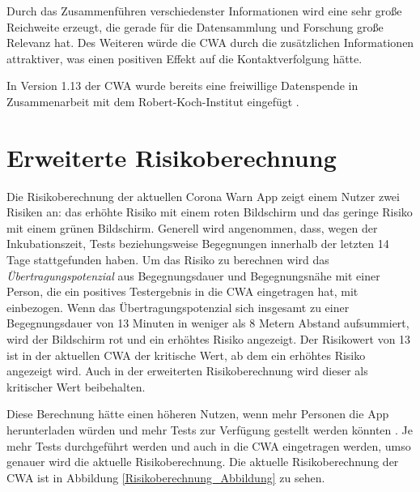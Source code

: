 \documentclass[conference,compsoc]{IEEEtran}
\begin{document}
Durch das Zusammenführen verschiedenster Informationen wird eine sehr große Reichweite erzeugt, die gerade für die Datensammlung und Forschung große Relevanz hat.
Des Weiteren würde die CWA durch die zusätzlichen Informationen attraktiver, was einen positiven Effekt auf die Kontaktverfolgung hätte.

In Version 1.13 der CWA wurde bereits eine freiwillige Datenspende in Zusammenarbeit mit dem Robert-Koch-Institut eingefügt \cite{freiwilligeDatenspende}. 

\section{Erweiterte Risikoberechnung} \label{Erweiterte_Risikoberechnung}

Die Risikoberechnung der aktuellen Corona Warn App zeigt einem Nutzer zwei Risiken an: 
das erhöhte Risiko mit einem roten Bildschirm und das geringe Risiko mit einem grünen Bildschirm. 
Generell wird angenommen, dass, wegen der Inkubationszeit, Tests beziehungsweise Begegnungen innerhalb der letzten 14 Tage stattgefunden haben.
Um das Risiko zu berechnen wird das \textit{Übertragungspotenzial} aus Begegnungsdauer und Begegnungsnähe mit einer Person, 
die ein positives Testergebnis in die CWA eingetragen hat, mit einbezogen. 
Wenn das Übertragungspotenzial sich insgesamt zu einer Begegnungsdauer von 13 Minuten in weniger als 8 Metern Abstand aufsummiert, 
wird der Bildschirm rot und ein erhöhtes Risiko angezeigt.
Der Risikowert von 13 ist in der aktuellen CWA der kritische Wert, ab dem ein erhöhtes Risiko angezeigt wird.
Auch in der erweiterten Risikoberechnung wird dieser als kritischer Wert beibehalten.

Diese Berechnung hätte einen höheren Nutzen, wenn mehr Personen die App herunterladen würden und mehr Tests zur Verfügung gestellt werden könnten \cite{EffectivenessCWA}.
Je mehr Tests durchgeführt werden und auch in die CWA eingetragen werden, umso genauer wird die aktuelle Risikoberechnung. 
Die aktuelle Risikoberechnung der CWA ist in Abbildung \ref{Risikoberechnung_Abbildung} zu sehen.
\end{document}
